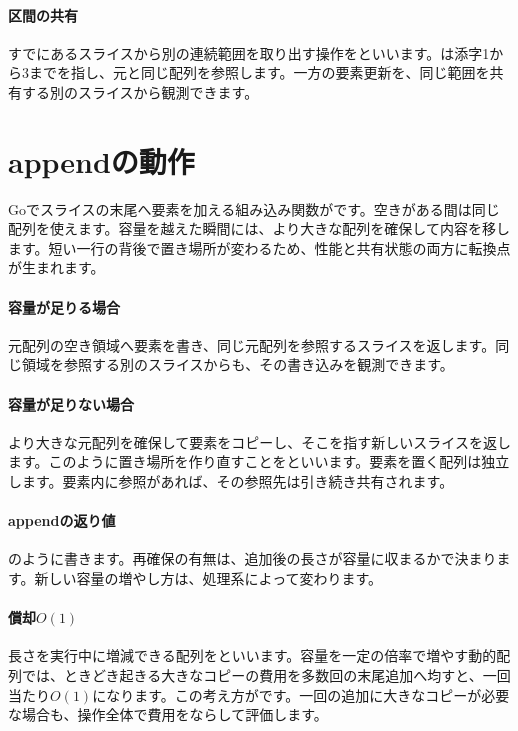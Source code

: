\paragraph{区間の共有}
        すでにあるスライスから別の連続範囲を取り出す操作をといいます。は添字1から3までを指し、元と同じ配列を参照します。一方の要素更新を、同じ範囲を共有する別のスライスから観測できます。

\par
\endgroup
\par
\endgroup


\section{appendの動作}
\label{sec:03-runtime-data-15}

Goでスライスの末尾へ要素を加える組み込み関数がです。空きがある間は同じ配列を使えます。容量を越えた瞬間には、より大きな配列を確保して内容を移します。短い一行の背後で置き場所が変わるため、性能と共有状態の両方に転換点が生まれます。

\begingroup
\begingroup
\paragraph{容量が足りる場合}
        元配列の空き領域へ要素を書き、同じ元配列を参照するスライスを返します。同じ領域を参照する別のスライスからも、その書き込みを観測できます。

\paragraph{容量が足りない場合}
        より大きな元配列を確保して要素をコピーし、そこを指す新しいスライスを返します。このように置き場所を作り直すことをといいます。要素を置く配列は独立します。要素内に参照があれば、その参照先は引き続き共有されます。

\par
\endgroup
\medskip
\begingroup
\paragraph{appendの返り値}
        のように書きます。再確保の有無は、追加後の長さが容量に収まるかで決まります。新しい容量の増やし方は、処理系によって変わります。

\paragraph{償却$O(1)$}
        長さを実行中に増減できる配列をといいます。容量を一定の倍率で増やす動的配列では、ときどき起きる大きなコピーの費用を多数回の末尾追加へ均すと、一回当たり$O(1)$になります。この考え方がです。一回の追加に大きなコピーが必要な場合も、操作全体で費用をならして評価します。

